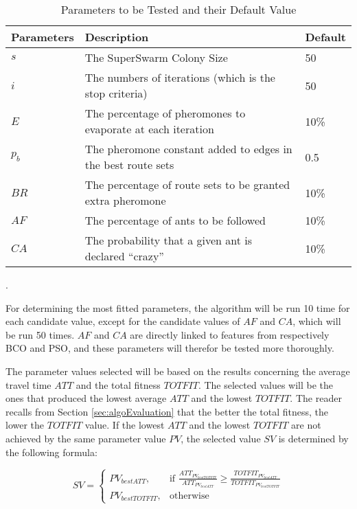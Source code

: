 \begin{table}[H]
	\small
	\begin{tabular}{|l|l|l|}
    	\hline
    	Parameters & Description & Default\\
    	\hline
    	$s$ & The SuperSwarm Colony Size & 50\\
    	$i$ & The numbers of iterations (which is the stop criteria) & 50\\
    	$E$ & The percentage of pheromones to evaporate at each iteration & 10\%\\
    	$p_b$ & The pheromone constant added to edges in the best route sets & 0.5\\
    	$BR$ & The percentage of route sets to be granted extra pheromone & 10\%\\
    	$AF$ & The percentage of ants to be followed & 10\%\\
    	$CA$ & The probability that a given ant is declared ``crazy'' & 10\%\\
   	    \hline
    \end{tabular}
    \caption {Parameters to be Tested and their Default Value}.
    \label{table:parameters}
\end{table}

For determining the most fitted parameters, the algorithm will be run 10 time for each candidate value, except for the candidate values of $AF$ and $CA$, which will be run 50 times. $AF$ and $CA$ are directly linked to features from respectively BCO and PSO, and these parameters will therefor be tested more thoroughly.

The parameter values selected will be based on the results concerning the average travel time $ATT$ and the total fitness $TOTFIT$. The selected values will be the ones that produced the lowest average $ATT$ and the lowest $TOTFIT$. The reader recalls from Section \vref{sec:algoEvaluation} that the better the total fitness, the lower the $TOTFIT$ value. If the lowest $ATT$ and the lowest $TOTFIT$ are not achieved by the same parameter value $PV$, the selected value $SV$ is determined by the following formula:

\[
    SV= 
\begin{cases}
    PV_{bestATT},& \text{if } \frac{ATT_{PV_{bestTOTFIT}}}{ATT_{PV_{bestATT}}}\geq \frac{TOTFIT_{PV_{bestATT}}}{TOTFIT_{PV_{bestTOTFIT}}}\\
    PV_{bestTOTFIT},& \text{otherwise}
\end{cases}
\]

